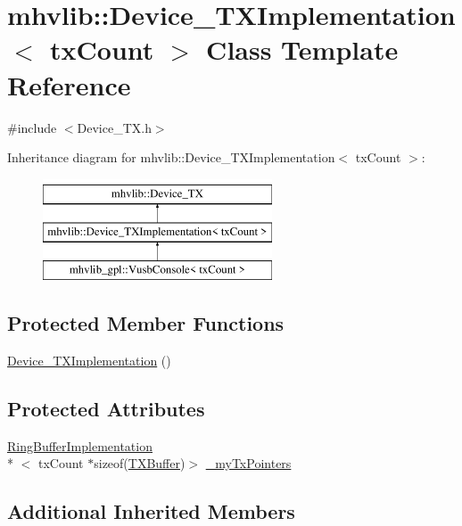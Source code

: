 \hypertarget{classmhvlib_1_1_device___t_x_implementation}{\section{mhvlib\-:\-:Device\-\_\-\-T\-X\-Implementation$<$ tx\-Count $>$ Class Template Reference}
\label{classmhvlib_1_1_device___t_x_implementation}
}


{\ttfamily \#include $<$Device\-\_\-\-T\-X.\-h$>$}

Inheritance diagram for mhvlib\-:\-:Device\-\_\-\-T\-X\-Implementation$<$ tx\-Count $>$\-:\begin{figure}[H]
\begin{center}
\leavevmode
\includegraphics[height=3.000000cm]{classmhvlib_1_1_device___t_x_implementation}
\end{center}
\end{figure}
\subsection*{Protected Member Functions}
\begin{DoxyCompactItemize}
\item 
\hyperlink{classmhvlib_1_1_device___t_x_implementation_a5bff81df9982f034e6d5c317da2a644b}{Device\-\_\-\-T\-X\-Implementation} ()
\end{DoxyCompactItemize}
\subsection*{Protected Attributes}
\begin{DoxyCompactItemize}
\item 
\hyperlink{classmhvlib_1_1_ring_buffer_implementation}{Ring\-Buffer\-Implementation}\\*
$<$ tx\-Count $\ast$sizeof(\hyperlink{classmhvlib_1_1_t_x_buffer}{T\-X\-Buffer})$>$ \hyperlink{classmhvlib_1_1_device___t_x_implementation_ab859df80993132adc5551abbd8870528}{\-\_\-my\-Tx\-Pointers}
\end{DoxyCompactItemize}
\subsection*{Additional Inherited Members}


